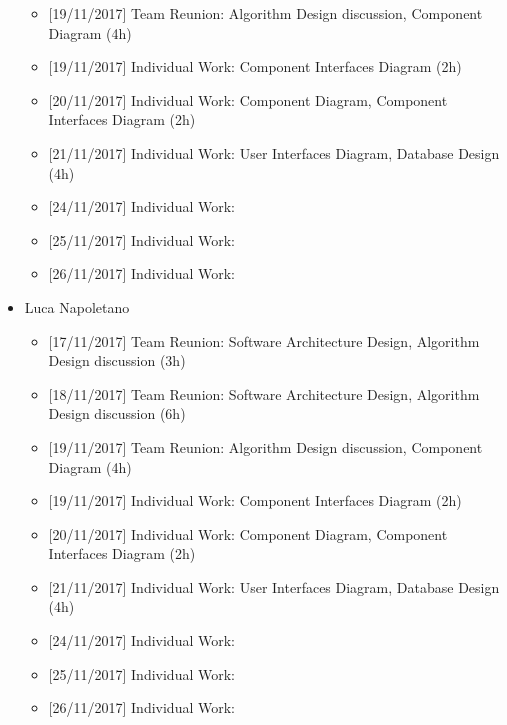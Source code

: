 \begin{itemize}
\begin{itemize}
            \item {[}19/11/2017{]} Team Reunion: Algorithm Design discussion, Component Diagram (4h)
            
            \item {[}19/11/2017{]} Individual Work: Component Interfaces Diagram (2h)
            
            \item {[}20/11/2017{]} Individual Work: Component Diagram, Component Interfaces Diagram (2h)
            
            \item {[}21/11/2017{]} Individual Work: User Interfaces Diagram, Database Design (4h)
            
            \item {[}24/11/2017{]} Individual Work:           

            \item {[}25/11/2017{]} Individual Work:
            
            \item {[}26/11/2017{]} Individual Work:

        \end{itemize}
    
    \item Luca Napoletano
        \begin{itemize}
            \item {[}17/11/2017{]} Team Reunion: Software Architecture Design, Algorithm Design discussion (3h)
            
            \item {[}18/11/2017{]} Team Reunion: Software Architecture Design, Algorithm Design discussion (6h)
            
            \item {[}19/11/2017{]} Team Reunion: Algorithm Design discussion, Component Diagram (4h)
            
            \item {[}19/11/2017{]} Individual Work: Component Interfaces Diagram (2h)
            
            \item {[}20/11/2017{]} Individual Work: Component Diagram, Component Interfaces Diagram (2h)
            
            \item {[}21/11/2017{]} Individual Work: User Interfaces Diagram, Database Design (4h)

            \item {[}24/11/2017{]} Individual Work:           

            \item {[}25/11/2017{]} Individual Work:
            
            \item {[}26/11/2017{]} Individual Work:
            
        \end{itemize}
        
\end{itemize}